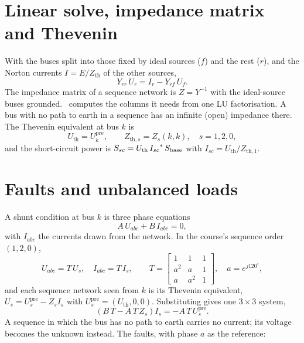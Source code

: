 \section{Linear solve, impedance matrix and Thevenin}

With the buses split into those fixed by ideal sources ($f$) and the rest ($r$), and the
Norton currents $I = E/Z_\text{th}$ of the other sources,
\[
  Y_{rr}\,U_r = I_r - Y_{rf}\,U_f .
\]
The impedance matrix of a sequence network is $Z = Y^{-1}$ with the ideal-source buses
grounded. \app\ computes the columns it needs from one LU factorisation. A bus with no
path to earth in a sequence has an infinite (open) impedance there. The Thevenin
equivalent at bus $k$ is
\[
  U_\text{th} = U_k^\text{pre}, \qquad Z_{\text{th},s} = Z_s(k,k), \quad s = 1, 2, 0,
\]
and the short-circuit power is $S_{sc} = U_\text{th}\,{I_{sc}}^{*}\,S_\text{base}$ with
$I_{sc} = U_\text{th}/Z_{\text{th},1}$.

\section{Faults and unbalanced loads}\label{sec:shunt-solver}

A shunt condition at bus $k$ is three phase equations
\[
  A\,U_{abc} + B\,I_{abc} = 0,
\]
with $I_{abc}$ the currents drawn from the network. In the course's sequence order
$(1, 2, 0)$,
\[
  U_{abc} = T\,U_s, \quad I_{abc} = T\,I_s, \qquad
  T = \begin{bmatrix} 1 & 1 & 1 \\ a^2 & a & 1 \\ a & a^2 & 1 \end{bmatrix}, \quad
  a = e^{j120^\circ},
\]
and each sequence network seen from $k$ is its Thevenin equivalent, $U_s = U_s^\text{pre}
- Z_s I_s$ with $U^\text{pre}_s = (U_\text{th}, 0, 0)$. Substituting gives one $3\times3$
system,
\[
  \left(B\,T - A\,T\,Z_s\right) I_s = -A\,T\,U_s^\text{pre}.
\]
A sequence in which the bus has no path to earth carries no current; its voltage becomes
the unknown instead. The faults, with phase $a$ as the reference:

